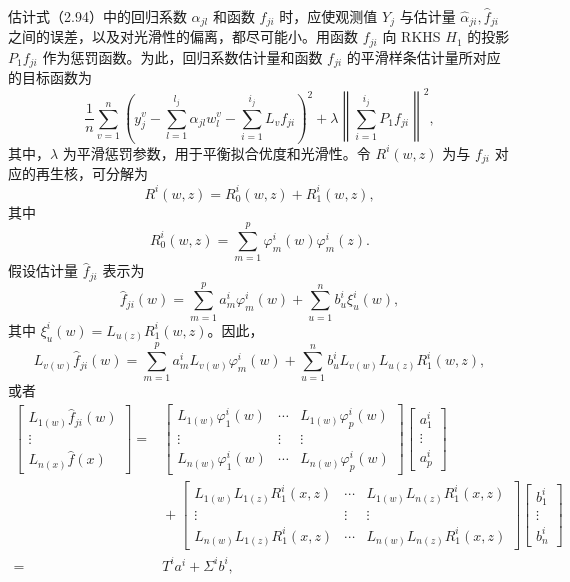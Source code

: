 估计式（2.94）中的回归系数 $\alpha_{jl}$ 和函数 $f_{ji}$ 时，应使观测值 $Y_j$ 与估计量 $\widehat\alpha_{ji},\widehat f_{ji}$ 之间的误差，以及对光滑性的偏离，都尽可能小。用函数 $f_{ji}$ 向 RKHS $H_1$ 的投影 $P_1f_{ji}$ 作为惩罚函数。为此，回归系数估计量和函数 $f_{ji}$ 的平滑样条估计量所对应的目标函数为
\begin{equation}
\frac1n\sum_{v=1}^{n}
\left(y_j^v-\sum_{l=1}^{l_j}\alpha_{jl}w_l^v
-\sum_{i=1}^{i_j}L_vf_{ji}\right)^2
+\lambda\left\lVert\sum_{i=1}^{i_j}P_1f_{ji}\right\rVert^2,
\tag{2.95}
\end{equation}
其中，$\lambda$ 为平滑惩罚参数，用于平衡拟合优度和光滑性。令 $R^i(w,z)$ 为与 $f_{ji}$ 对应的再生核，可分解为
\[
R^i(w,z)=R_0^i(w,z)+R_1^i(w,z),
\]
其中
\begin{equation}
R_0^i(w,z)=\sum_{m=1}^{p}\varphi_m^i(w)\varphi_m^i(z).
\tag{2.96}
\end{equation}
假设估计量 $\widehat f_{ji}$ 表示为
\begin{equation}
\widehat f_{ji}(w)=\sum_{m=1}^{p}a_m^i\varphi_m^i(w)
+\sum_{u=1}^{n}b_u^i\xi_u^i(w),
\tag{2.97}
\end{equation}
其中 $\xi_u^i(w)=L_{u(z)}R_1^i(w,z)$。因此，
\begin{equation}
L_{v(w)}\widehat f_{ji}(w)=
\sum_{m=1}^{p}a_m^iL_{v(w)}\varphi_m^i(w)
+\sum_{u=1}^{n}b_u^iL_{v(w)}L_{u(z)}R_1^i(w,z),
\tag{2.98}
\end{equation}
或者
\[
\begin{aligned}
\begin{bmatrix}
L_{1(w)}\widehat f_{ji}(w)\\\vdots\\L_{n(x)}\widehat f(x)
\end{bmatrix}
={}&
\begin{bmatrix}
L_{1(w)}\varphi_1^i(w)&\cdots&L_{1(w)}\varphi_p^i(w)\\
\vdots&\vdots&\vdots\\
L_{n(w)}\varphi_1^i(w)&\cdots&L_{n(w)}\varphi_p^i(w)
\end{bmatrix}
\begin{bmatrix}a_1^i\\\vdots\\a_p^i\end{bmatrix}\\
&{}+
\begin{bmatrix}
L_{1(w)}L_{1(z)}R_1^i(x,z)&\cdots&L_{1(w)}L_{n(z)}R_1^i(x,z)\\
\vdots&\vdots&\vdots\\
L_{n(w)}L_{1(z)}R_1^i(x,z)&\cdots&L_{n(w)}L_{n(z)}R_1^i(x,z)
\end{bmatrix}
\begin{bmatrix}b_1^i\\\vdots\\b_n^i\end{bmatrix}\\
={}&T^ia^i+\Sigma^ib^i,
\end{aligned}
\]
